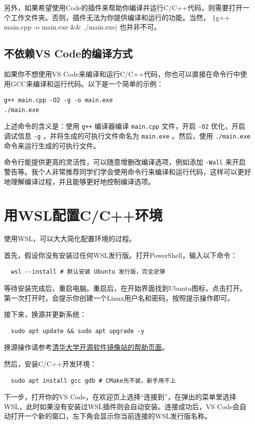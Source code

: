 另外，如果希望使用Code的插件来帮助你编译并运行C/C++代码，则需要打开一个工作文件夹。否则，插件无法为你提供编译和运行的功能。当然， \texttt|g++ main.cpp -o main.exe && ./main.exe| 也并非不可。

\subsection{不依赖VS Code的编译方式}

如果你不想使用VS Code来编译和运行C/C++代码，你也可以直接在命令行中使用GCC来编译和运行代码。以下是一个简单的示例：
\begin{verbatim}
g++ main.cpp -O2 -g -o main.exe
./main.exe
\end{verbatim}
上述命令的含义是：使用 \texttt{g++} 编译器编译 \texttt{main.cpp} 文件，开启 \texttt{-O2} 优化，开启调试信息 \texttt{-g} ，并将生成的可执行文件命名为 \texttt{main.exe} 。然后，使用 \texttt{./main.exe} 命令来运行生成的可执行文件。

命令行能提供更高的灵活性，可以随意增删改编译选项，例如添加 \texttt{-Wall} 来开启警告等。我个人非常推荐同学们学会使用命令行来编译和运行代码，这样可以更好地理解编译过程，并且能够更好地控制编译选项。

\section{用WSL配置C/C++环境}\label{sec:wsl-cpp}

使用WSL，可以大大简化配置环境的过程。

首先，假设你没有安装过任何WSL发行版。打开PowerShell，输入以下命令：
\begin{verbatim}
  wsl --install # 默认安装 Ubuntu 发行版，完全足够
\end{verbatim}
等待安装完成后，重启电脑。重启后，在开始界面找到Ubuntu图标，点击打开。第一次打开时，会提示你创建一个Linux用户名和密码，按照提示操作即可。

接下来，换源并更新系统：
\begin{verbatim}
  sudo apt update && sudo apt upgrade -y
\end{verbatim}
换源操作请参考\href{https://mirrors.tuna.tsinghua.edu.cn/help/ubuntu/}{清华大学开源软件镜像站的帮助页面}。

然后，安装C/C++开发环境：
\begin{verbatim}
  sudo apt install gcc gdb # CMake先不装，新手用不上
\end{verbatim}

下一步，打开你的VS Code，在欢迎页上选择“连接到”，在弹出的菜单里选择WSL，此时如果没有安装过WSL插件则会自动安装。连接成功后，VS Code会自动打开一个新的窗口，左下角会显示你当前连接的WSL发行版名称。

